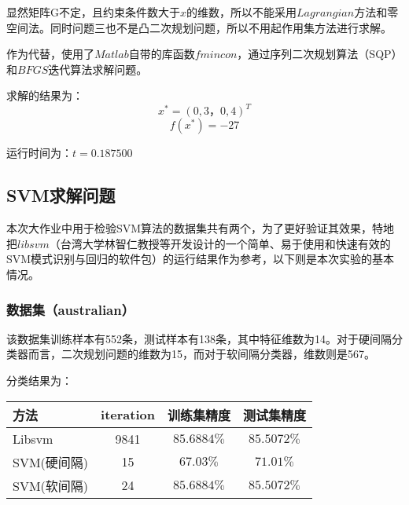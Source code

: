\documentclass[12pt]{article}
\begin{document}
	          显然矩阵G不定，且约束条件数大于$x$的维数，所以不能采用$Lagrangian$方法和零空间法。同时问题三也不是凸二次规划问题，所以不用起作用集方法进行求解。
	          
	          作为代替，使用了$Matlab$自带的库函数$fmincon$，通过序列二次规划算法（SQP）和$BFGS$迭代算法求解问题。
	          
	          求解的结果为：
	          \[x^{\ast} = (0,3，0,4)^T\]
	          \[f(x^{\ast}) = -27 \]
	          
	          运行时间为：$t = 0.187500$
	          
	          \vspace{15pt}
	       
	    \vspace{20pt}
	    \subsection{SVM求解问题}
	       
	       本次大作业中用于检验SVM算法的数据集共有两个，为了更好验证其效果，特地把$libsvm$（台湾大学林智仁教授等开发设计的一个简单、易于使用和快速有效的SVM模式识别与回归的软件包）的运行结果作为参考，以下则是本次实验的基本情况。
	       
	       \vspace{15pt}
	       
	       \subsubsection{数据集（australian）}
	          
	          该数据集训练样本有552条，测试样本有138条，其中特征维数为14。对于硬间隔分类器而言，二次规划问题的维数为15，而对于软间隔分类器，维数则是567。
	          
	          分类结果为：
	          
	          \vspace{10pt}
	          \begin{tabular}{|l|c|c|c|}
	          	\hline
	          	方法 & iteration & 训练集精度 & 测试集精度  \\\hline
	          	Libsvm & 9841 & $85.6884\%$ & $85.5072\%$  \\\hline
	          	SVM(硬间隔) & 15 & $67.03\%$ & $71.01\%$  \\\hline
	          	SVM(软间隔) & 24 & $85.6884\%$ & $85.5072\%$  \\\hline
	          \end{tabular}
	       \vspace{15pt}   
	       
\end{document}
